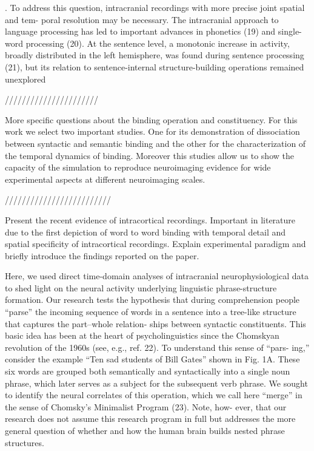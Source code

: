 \documentclass[10pt]{article}
\begin{document}
. To address this question,
intracranial recordings with more precise joint spatial and tem-
poral resolution may be necessary. The intracranial approach to
language processing has led to important advances in phonetics
(19) and single-word processing (20). At the sentence level, a
monotonic increase in activity, broadly distributed in the left
hemisphere, was found during sentence processing (21), but its
relation to sentence-internal structure-building operations remained
unexplored

//////////////////////

More specific questions about the binding operation and constituency.
For this work we select two important studies. One for its demonstration of dissociation between syntactic and semantic binding and the other for the characterization of the temporal dynamics of binding. Moreover this studies allow us to show the capacity of the simulation to reproduce neuroimaging evidence for wide experimental aspects at different neuroimaging scales.

/////////////////////////

Present the recent evidence of intracortical recordings.
Important in literature due to the first depiction of word to
word binding with temporal detail and spatial specificity
of intracortical recordings. Explain experimental paradigm
and briefly introduce the findings reported on the paper.

Here, we used direct time-domain
analyses of intracranial neurophysiological data to shed light on the
neural activity underlying linguistic phrase-structure formation.
Our research tests the hypothesis that during comprehension
people “parse” the incoming sequence of words in a sentence
into a tree-like structure that captures the part–whole relation-
ships between syntactic constituents. This basic idea has been at
the heart of psycholinguistics since the Chomskyan revolution of
the 1960s (see, e.g., ref. 22). To understand this sense of “pars-
ing,” consider the example “Ten sad students of Bill Gates”
shown in Fig. 1A. These six words are grouped both semantically
and syntactically into a single noun phrase, which later serves as
a subject for the subsequent verb phrase. We sought to identify
the neural correlates of this operation, which we call here “merge”
in the sense of Chomsky’s Minimalist Program (23). Note, how-
ever, that our research does not assume this research program in
full but addresses the more general question of whether and how
the human brain builds nested phrase structures.
\end{document}
